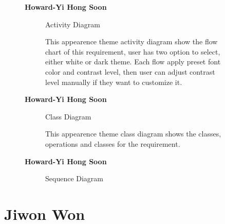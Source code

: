 \documentclass{article}
\begin{document}
		\begin{figure}[htbp]
			\textbf{Howard-Yi Hong Soon}
			\centering
			\begin{subfigure}{\textwidth}
				\resizebox{\textwidth}{!}{}
				\caption{Activity Diagram}
			\end{subfigure}
			\begin{subfigure}{\textwidth}
				This appearence theme activity diagram show the flow chart of this requirement, user has two option to select, either white or dark theme.
				Each flow apply preset font color and contrast level, then user can adjust contrast level manually if they want to customize it.
			\end{subfigure}
		\end{figure}
		\newpage
		

		\begin{figure}[htbp]
			\textbf{Howard-Yi Hong Soon}
			\centering
			\begin{subfigure}{\textwidth}
				\resizebox{\textwidth}{!}{}
				\caption{Class Diagram}
			\end{subfigure}
			\begin{subfigure}{\textwidth}
				This appearence theme class diagram shows the classes, operations and classes for the requirement.
			\end{subfigure}
		\end{figure}
		

		\begin{figure}[htbp]
			\textbf{Howard-Yi Hong Soon}
			\centering
			\begin{subfigure}{\textwidth}
				\resizebox{\textwidth}{!}{}
				\caption{Sequence Diagram}
			\end{subfigure}
			\begin{subfigure}{\textwidth}
			\end{subfigure}
		\end{figure}
		\newpage

\section{Jiwon Won}
\end{document}
